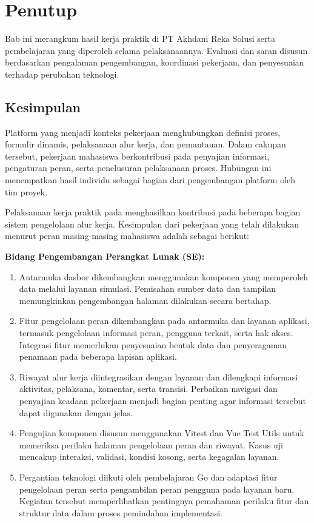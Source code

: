 \chapter{Penutup}
Bab ini merangkum hasil kerja praktik di PT Akhdani Reka Solusi serta pembelajaran yang diperoleh selama pelaksanaannya. Evaluasi dan saran disusun berdasarkan pengalaman pengembangan, koordinasi pekerjaan, dan penyesuaian terhadap perubahan teknologi.

\section{Kesimpulan}
Platform yang menjadi konteks pekerjaan menghubungkan definisi proses, formulir dinamis, pelaksanaan alur kerja, dan pemantauan. Dalam cakupan tersebut, pekerjaan mahasiswa berkontribusi pada penyajian informasi, pengaturan peran, serta penelusuran pelaksanaan proses. Hubungan ini menempatkan hasil individu sebagai bagian dari pengembangan platform oleh tim proyek.

Pelaksanaan kerja praktik pada \PeriodeKP{} menghasilkan kontribusi pada beberapa bagian sistem pengelolaan alur kerja. Kesimpulan dari pekerjaan yang telah dilakukan menurut peran masing-masing mahasiswa adalah sebagai berikut:

\noindent\textbf{Bidang Pengembangan Perangkat Lunak (SE):}
\begin{enumerate}[label=\arabic*)]
\item Antarmuka dasbor dikembangkan menggunakan komponen yang memperoleh data melalui layanan simulasi. Pemisahan sumber data dan tampilan memungkinkan pengembangan halaman dilakukan secara bertahap.
\item Fitur pengelolaan peran dikembangkan pada antarmuka dan layanan aplikasi, termasuk pengelolaan informasi peran, pengguna terkait, serta hak akses. Integrasi fitur memerlukan penyesuaian bentuk data dan penyeragaman penamaan pada beberapa lapisan aplikasi.
\item Riwayat alur kerja diintegrasikan dengan layanan dan dilengkapi informasi aktivitas, pelaksana, komentar, serta transisi. Perbaikan navigasi dan penyajian keadaan pekerjaan menjadi bagian penting agar informasi tersebut dapat digunakan dengan jelas.
\item Pengujian komponen disusun menggunakan Vitest dan Vue Test Utils untuk memeriksa perilaku halaman pengelolaan peran dan riwayat. Kasus uji mencakup interaksi, validasi, kondisi kosong, serta kegagalan layanan.
\item Pergantian teknologi diikuti oleh pembelajaran Go dan adaptasi fitur pengelolaan peran serta pengambilan peran pengguna pada layanan baru. Kegiatan tersebut memperlihatkan pentingnya pemahaman perilaku fitur dan struktur data dalam proses pemindahan implementasi.
\end{enumerate}

